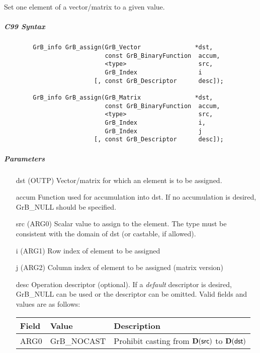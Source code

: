 Set one element of a vector/matrix to a given value.

\subparagraph{C99 Syntax}

\begin{verbatim}
        GrB_info GrB_assign(GrB_Vector               *dst,
                            const GrB_BinaryFunction  accum,
                            <type>                    src,
                            GrB_Index                 i
                         [, const GrB_Descriptor      desc]); 

        GrB_info GrB_assign(GrB_Matrix               *dst,
                            const GrB_BinaryFunction  accum,
                            <type>                    src,
                            GrB_Index                 i,
                            GrB_Index                 j
                         [, const GrB_Descriptor      desc]); 
\end{verbatim}

\subparagraph{Parameters}

\begin{itemize}[leftmargin=1.1in]
    \item[{\sf dst}]   ({\sf OUTP}) Vector/matrix for which an element is to be assigned.

    \item[{\sf accum}] Function used for accumulation into {\sf dst}.  If no accumulation
                        is desired, {\sf GrB\_NULL} should be specified.

    \item[{\sf src}]   ({\sf ARG0}) Scalar value to assign to the element.  The type must
                              be consistent with the domain of dst (or castable, if allowed).
    \item[{\sf i}]     ({\sf ARG1}) Row index of element to be assigned
    \item[{\sf j}]     ({\sf ARG2}) Column index of element to be assigned (matrix version)

    \item[{\sf desc}]   Operation descriptor (optional). If a
    \emph{default} descriptor is desired, {\sf GrB\_NULL} can be
    used or the descriptor can be omitted.  Valid fields and values are as follows: \\
    \begin{tabular}{lll}
    Field  & Value & Description \\
    \hline
    {\sf ARG0} & {\sf GrB\_NOCAST} & Prohibit casting from $\bold{D}({\sf src})$ to $\bold{D}({\sf dst})$ \\
    \end{tabular}

\end{itemize}

